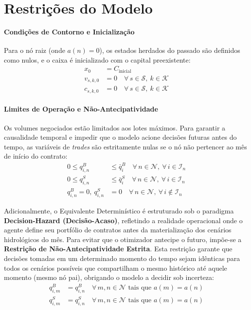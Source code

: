 \documentclass[12pt, a4paper]{article}
\begin{document}
\section{Restrições do Modelo}

\paragraph{Condições de Contorno e Inicialização}
Para o nó raiz (onde $a(n) = 0$), os estados herdados do passado são definidos como nulos, e o caixa é inicializado com o capital preexistente:
\begin{align}
    x_0 &= C_{\text{inicial}} \\
    v_{s,k,0} &= 0 \quad \forall\, s \in \mathcal{S},\ k \in \mathcal{K} \\
    c_{s,k,0} &= 0 \quad \forall\, s \in \mathcal{S},\ k \in \mathcal{K}
\end{align}

\paragraph{Limites de Operação e Não-Antecipatividade}
Os volumes negociados estão limitados aos lotes máximos. Para garantir a causalidade temporal e impedir que o modelo acione decisões futuras antes do tempo, as variáveis de \textit{trades} são estritamente nulas se o nó não pertencer ao mês de início do contrato:
\begin{align}
    0 \le q_{i,n}^B &\le \bar{q}_i^B \quad \forall\, n \in \mathcal{N},\ \forall\, i \in \mathcal{I}_n \\
    0 \le q_{i,n}^S &\le \bar{q}_i^S \quad \forall\, n \in \mathcal{N},\ \forall\, i \in \mathcal{I}_n \\
    q_{i,n}^B = 0,\ q_{i,n}^S &= 0 \quad \forall\, n \in \mathcal{N},\ \forall\, i \notin \mathcal{I}_n
\end{align}

Adicionalmente, o Equivalente Determinístico é estruturado sob o paradigma \textbf{Decision-Hazard (Decisão-Acaso)}, refletindo a realidade operacional onde o agente define seu portfólio de contratos antes da materialização dos cenários hidrológicos do mês. Para evitar que o otimizador antecipe o futuro, impõe-se a \textbf{Restrição de Não-Antecipatividade Estrita}. Esta restrição garante que decisões tomadas em um determinado momento do tempo sejam idênticas para todos os cenários possíveis que compartilham o mesmo histórico até aquele momento (mesmo nó pai), obrigando o modelo a decidir sob incerteza:
\begin{align}
    q_{i,m}^B &= q_{i,n}^B \quad \forall\, m, n \in \mathcal{N} \text{ tais que } a(m) = a(n) \\
    q_{i,m}^S &= q_{i,n}^S \quad \forall\, m, n \in \mathcal{N} \text{ tais que } a(m) = a(n)
\end{align}
\end{document}
